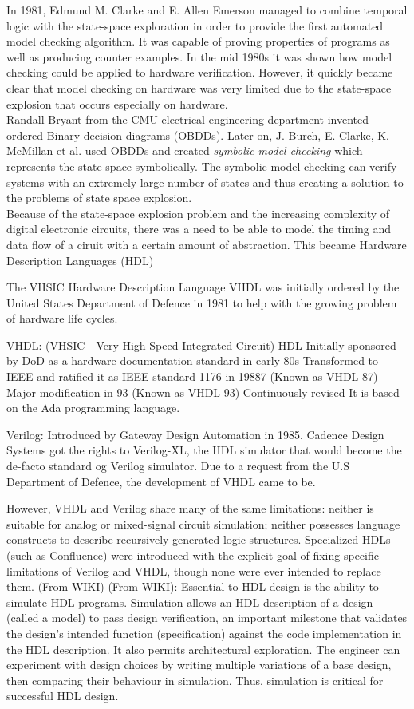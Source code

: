 \documentclass[a4paper]{report}
\begin{document}
In 1981, Edmund M. Clarke and E. Allen Emerson managed to combine temporal logic with the state-space exploration in order to provide the first automated model checking algorithm\cite{Clarke1981}. It was capable of proving properties of programs as well as producing counter examples. 
In the mid 1980s it was shown how model checking could be applied to hardware verification. However, it quickly became clear that model checking on hardware was very limited due to the state-space explosion that occurs especially on hardware. \\ 
Randall Bryant from the CMU electrical engineering department invented ordered Binary decision diagrams (OBDDs). Later on, J. Burch, E. Clarke, K. McMillan et al.\cite{Burch1992} used OBDDs and created \textit{symbolic model checking} which represents the state space symbolically. The symbolic model checking can verify systems with an extremely large number of states and thus creating a solution to the problems of state space explosion.\\
Because of the state-space explosion problem and the increasing complexity of digital electronic circuits, there was a need to be able to model the timing and data flow of a ciruit with a certain amount of abstraction. This became Hardware Description Languages (HDL) 


The VHSIC Hardware Description Language 
VHDL was initially ordered by the United States Department of Defence in 1981 to help with the growing problem of hardware life cycles. 


VHDL: (VHSIC - Very High Speed Integrated Circuit) HDL
Initially sponsored by DoD as a hardware documentation standard in early 80s
Transformed to IEEE and ratified it as IEEE standard 1176 in 19887 (Known as VHDL-87)
Major modification in 93 (Known as VHDL-93)
Continuously revised
It is based on the Ada programming language. 

Verilog: Introduced by Gateway Design Automation in 1985. Cadence Design Systems got the rights to Verilog-XL, the HDL simulator that would become the de-facto standard og Verilog simulator. Due to a request from the U.S Department of Defence, the development of VHDL came to be. 

However, VHDL and Verilog share many of the same limitations: neither is suitable for analog or mixed-signal circuit simulation; neither possesses language constructs to describe recursively-generated logic structures. Specialized HDLs (such as Confluence) were introduced with the explicit goal of fixing specific limitations of Verilog and VHDL, though none were ever intended to replace them. (From WIKI)
(From WIKI): Essential to HDL design is the ability to simulate HDL programs. Simulation allows an HDL description of a design (called a model) to pass design verification, an important milestone that validates the design's intended function (specification) against the code implementation in the HDL description. It also permits architectural exploration. The engineer can experiment with design choices by writing multiple variations of a base design, then comparing their behaviour in simulation. Thus, simulation is critical for successful HDL design.
\end{document}
